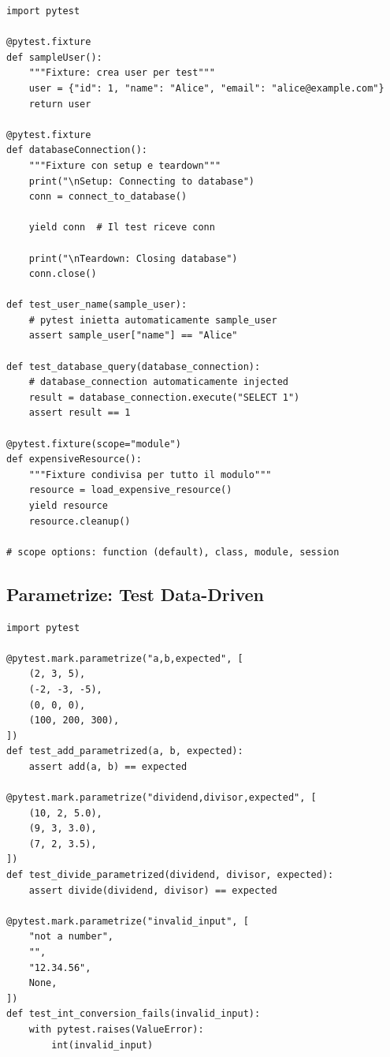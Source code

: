 \begin{lstlisting}
import pytest

@pytest.fixture
def sampleUser():
    """Fixture: crea user per test"""
    user = {"id": 1, "name": "Alice", "email": "alice@example.com"}
    return user

@pytest.fixture
def databaseConnection():
    """Fixture con setup e teardown"""
    print("\nSetup: Connecting to database")
    conn = connect_to_database()

    yield conn  # Il test riceve conn

    print("\nTeardown: Closing database")
    conn.close()

def test_user_name(sample_user):
    # pytest inietta automaticamente sample_user
    assert sample_user["name"] == "Alice"

def test_database_query(database_connection):
    # database_connection automaticamente injected
    result = database_connection.execute("SELECT 1")
    assert result == 1

@pytest.fixture(scope="module")
def expensiveResource():
    """Fixture condivisa per tutto il modulo"""
    resource = load_expensive_resource()
    yield resource
    resource.cleanup()

# scope options: function (default), class, module, session
\end{lstlisting}

\subsection{Parametrize: Test Data-Driven}

\begin{lstlisting}
import pytest

@pytest.mark.parametrize("a,b,expected", [
    (2, 3, 5),
    (-2, -3, -5),
    (0, 0, 0),
    (100, 200, 300),
])
def test_add_parametrized(a, b, expected):
    assert add(a, b) == expected

@pytest.mark.parametrize("dividend,divisor,expected", [
    (10, 2, 5.0),
    (9, 3, 3.0),
    (7, 2, 3.5),
])
def test_divide_parametrized(dividend, divisor, expected):
    assert divide(dividend, divisor) == expected

@pytest.mark.parametrize("invalid_input", [
    "not a number",
    "",
    "12.34.56",
    None,
])
def test_int_conversion_fails(invalid_input):
    with pytest.raises(ValueError):
        int(invalid_input)
\end{lstlisting}

